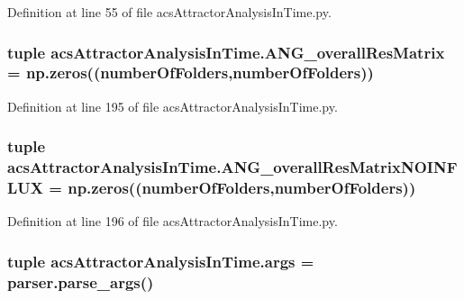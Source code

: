Definition at line 55 of file acs\+Attractor\+Analysis\+In\+Time.\+py.

\hypertarget{a00125_a15adfffa273548845cea67d8b89f0bb1}{
\subsubsection[{A\+N\+G\+\_\+overall\+Res\+Matrix}]{\setlength{\rightskip}{0pt plus 5cm}tuple acs\+Attractor\+Analysis\+In\+Time.\+A\+N\+G\+\_\+overall\+Res\+Matrix = np.\+zeros(({\bf number\+Of\+Folders},{\bf number\+Of\+Folders}))}}\label{a00125_a15adfffa273548845cea67d8b89f0bb1}


Definition at line 195 of file acs\+Attractor\+Analysis\+In\+Time.\+py.

\hypertarget{a00125_a7b0e67be0cf8de69432bdf56919d9e33}{
\subsubsection[{A\+N\+G\+\_\+overall\+Res\+Matrix\+N\+O\+I\+N\+F\+L\+U\+X}]{\setlength{\rightskip}{0pt plus 5cm}tuple acs\+Attractor\+Analysis\+In\+Time.\+A\+N\+G\+\_\+overall\+Res\+Matrix\+N\+O\+I\+N\+F\+L\+U\+X = np.\+zeros(({\bf number\+Of\+Folders},{\bf number\+Of\+Folders}))}}\label{a00125_a7b0e67be0cf8de69432bdf56919d9e33}


Definition at line 196 of file acs\+Attractor\+Analysis\+In\+Time.\+py.

\hypertarget{a00125_ab6621347b1ac2fe0e436bd2f384af8dc}{
\subsubsection[{args}]{\setlength{\rightskip}{0pt plus 5cm}tuple acs\+Attractor\+Analysis\+In\+Time.\+args = parser.\+parse\+\_\+args()}}\label{a00125_ab6621347b1ac2fe0e436bd2f384af8dc}


